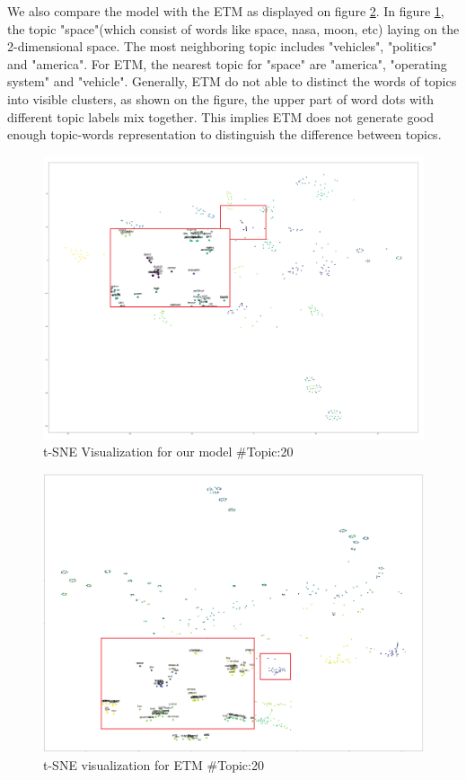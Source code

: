 We also compare the model with the ETM as displayed on figure \ref{fig:tsne20t50w1_etm}. In figure \ref{fig:tsne20t25w2}, the topic "space"(which consist of words like space, nasa, moon, etc) laying on the 2-dimensional space. The most neighboring topic includes "vehicles", "politics" and "america". For ETM, the nearest topic for "space" are "america", "operating system" and "vehicle". Generally, ETM do not able to distinct the words of topics into visible clusters, as shown on the figure, the upper part of word dots with different topic labels mix together. This implies ETM does not generate good enough topic-words representation to distinguish the difference between topics.
\begin{figure}
\centering
\includegraphics[width=1\linewidth]{figures/0908/tsne_20t_25w_2}
\caption{t-SNE Visualization for our model \#Topic:20}
\label{fig:tsne20t25w2}
\end{figure}
\begin{figure}
\centering
\includegraphics[width=1\linewidth]{"figures/0112/tsne_20t_50w(1) - Copy"}
\caption{t-SNE visualization for ETM \#Topic:20}
\label{fig:tsne20t50w1_etm}
\end{figure}
